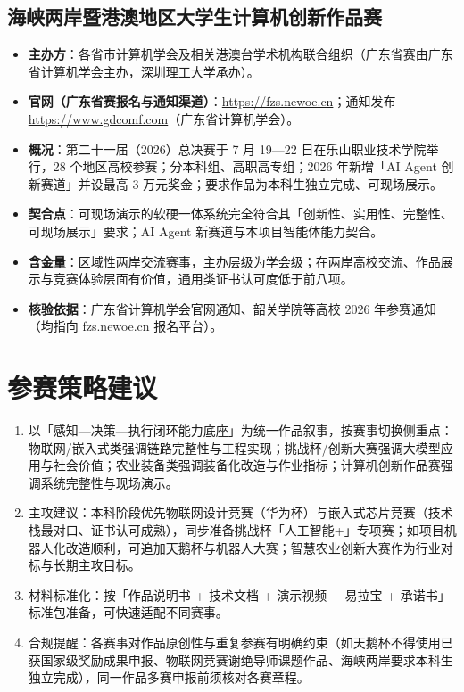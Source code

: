 \documentclass[11pt]{ctexart}
\begin{document}
\subsection{海峡两岸暨港澳地区大学生计算机创新作品赛}
\begin{itemize}
  \item \textbf{主办方}：各省市计算机学会及相关港澳台学术机构联合组织（广东省赛由广东省计算机学会主办，深圳理工大学承办）。
  \item \textbf{官网（广东省赛报名与通知渠道）}：\url{https://fzs.newoe.cn}；通知发布 \url{https://www.gdcomf.com}（广东省计算机学会）。
  \item \textbf{概况}：第二十一届（2026）总决赛于 7 月 19—22 日在乐山职业技术学院举行，28 个地区高校参赛；分本科组、高职高专组；2026 年新增「AI Agent 创新赛道」并设最高 3 万元奖金；要求作品为本科生独立完成、可现场展示。
  \item \textbf{契合点}：可现场演示的软硬一体系统完全符合其「创新性、实用性、完整性、可现场展示」要求；AI Agent 新赛道与本项目智能体能力契合。
  \item \textbf{含金量}：区域性两岸交流赛事，主办层级为学会级；在两岸高校交流、作品展示与竞赛体验层面有价值，通用类证书认可度低于前八项。
  \item \textbf{核验依据}：广东省计算机学会官网通知、韶关学院等高校 2026 年参赛通知（均指向 fzs.newoe.cn 报名平台）。
\end{itemize}

\section{参赛策略建议}
\begin{enumerate}
  \item 以「感知—决策—执行闭环能力底座」为统一作品叙事，按赛事切换侧重点：物联网/嵌入式类强调链路完整性与工程实现；挑战杯/创新大赛强调大模型应用与社会价值；农业装备类强调装备化改造与作业指标；计算机创新作品赛强调系统完整性与现场演示。
  \item 主攻建议：本科阶段优先物联网设计竞赛（华为杯）与嵌入式芯片竞赛（技术栈最对口、证书认可成熟），同步准备挑战杯「人工智能+」专项赛；如项目机器人化改造顺利，可追加天鹅杯与机器人大赛；智慧农业创新大赛作为行业对标与长期主攻目标。
  \item 材料标准化：按「作品说明书 + 技术文档 + 演示视频 + 易拉宝 + 承诺书」标准包准备，可快速适配不同赛事。
  \item 合规提醒：各赛事对作品原创性与重复参赛有明确约束（如天鹅杯不得使用已获国家级奖励成果申报、物联网竞赛谢绝导师课题作品、海峡两岸要求本科生独立完成），同一作品多赛申报前须核对各赛章程。
\end{enumerate}
\end{document}
